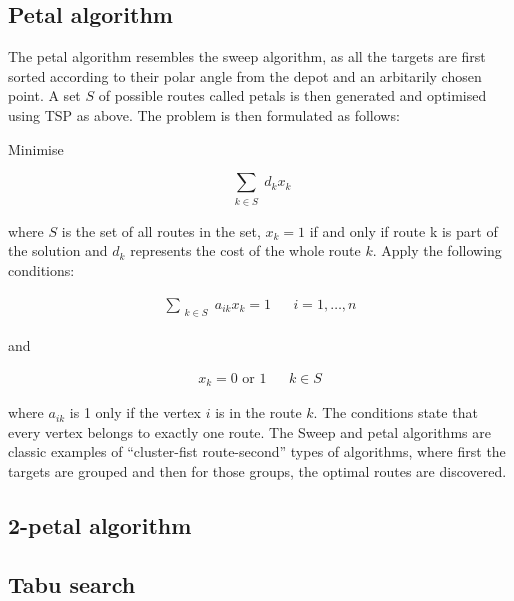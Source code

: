 \subsection{Petal algorithm}

The petal algorithm resembles the sweep algorithm, as all the targets are first sorted according to their polar angle from the depot and an arbitarily chosen point. A set $S$ of possible routes called petals is then generated and optimised using TSP as above. The problem is then formulated as follows:


\bigskip
\noindent
Minimise

\begin{equation}
\label{eq:petal1}
\displaystyle\sum_{\substack{k \in S}} d_kx_k
\end{equation}


\noindent
where $S$ is the set of all routes in the set, $x_k = 1$ if and only if route k is part of the solution and $d_k$ represents the cost of the whole route $k$. Apply the following conditions:

\begin{equation}
\begin{aligned}
\label{eq:petal2}
\displaystyle\sum_{\substack{k \in S}} a_{ik}x_k = 1 && i = 1, \ldots, n
\end{aligned}
\end{equation}

\noindent
and

\begin{equation}
\begin{aligned}
\label{eq:petal3}
x_{k} = 0 \text{ or } 1 && k \in S
\end{aligned}
\end{equation}

where $a_{ik}$ is 1 only if the vertex $i$ is in the route $k$. \cite{laporte2000classical} The conditions state that every vertex belongs to exactly one route. The Sweep and petal algorithms are classic examples of ``cluster-fist route-second'' types of algorithms, where first the targets are grouped and then for those groups, the optimal routes are discovered. 

\subsection{2-petal algorithm}

\subsection{Tabu search}

